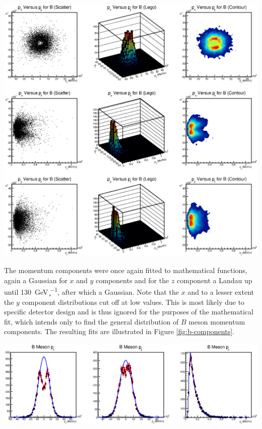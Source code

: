 \begin{center}
    \includegraphics[width=\linewidth]{graphs/BMomentumComponentCorrelation.eps}
    \label{fig:b-correlation-graphs}
\end{center}

The momentum components were once again fitted to mathematical functions, again
a Gaussian for $x$ and $y$ components and for the $z$ component a Landau up
until \SI{130}{\giga\electronvolt\per\c}, after which a Gaussian. Note that the
$x$ and to a lesser extent the $y$ component distributions cut off at low
values. This is most likely due to specific detector design and is thus ignored
for the purposes of the mathematical fit, which intends only to find the general
distribution of $B$ meson momentum components. The resulting fits are
illustrated in Figure \ref{fig:b-components}.

\begin{center}
    \includegraphics[width=\linewidth]{graphs/BMomentumComponentFit.eps}
    \label{fig:b-components}
\end{center}

